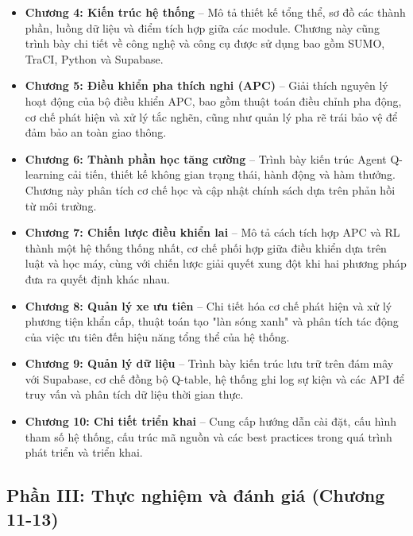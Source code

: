 \begin{itemize}[leftmargin=1.5em]
    \item \textbf{Chương 4: Kiến trúc hệ thống} -- Mô tả thiết kế tổng thể, sơ đồ các thành phần, luồng dữ liệu và điểm tích hợp giữa các module. Chương này cũng trình bày chi tiết về công nghệ và công cụ được sử dụng bao gồm SUMO, TraCI, Python và Supabase.
    
    \item \textbf{Chương 5: Điều khiển pha thích nghi (APC)} -- Giải thích nguyên lý hoạt động của bộ điều khiển APC, bao gồm thuật toán điều chỉnh pha động, cơ chế phát hiện và xử lý tắc nghẽn, cũng như quản lý pha rẽ trái bảo vệ để đảm bảo an toàn giao thông.
    
    \item \textbf{Chương 6: Thành phần học tăng cường} -- Trình bày kiến trúc Agent Q-learning cải tiến, thiết kế không gian trạng thái, hành động và hàm thưởng. Chương này phân tích cơ chế học và cập nhật chính sách dựa trên phản hồi từ môi trường.
    
    \item \textbf{Chương 7: Chiến lược điều khiển lai} -- Mô tả cách tích hợp APC và RL thành một hệ thống thống nhất, cơ chế phối hợp giữa điều khiển dựa trên luật và học máy, cùng với chiến lược giải quyết xung đột khi hai phương pháp đưa ra quyết định khác nhau.
    
    \item \textbf{Chương 8: Quản lý xe ưu tiên} -- Chi tiết hóa cơ chế phát hiện và xử lý phương tiện khẩn cấp, thuật toán tạo "làn sóng xanh" và phân tích tác động của việc ưu tiên đến hiệu năng tổng thể của hệ thống.
    
    \item \textbf{Chương 9: Quản lý dữ liệu} -- Trình bày kiến trúc lưu trữ trên đám mây với Supabase, cơ chế đồng bộ Q-table, hệ thống ghi log sự kiện và các API để truy vấn và phân tích dữ liệu thời gian thực.
    
    \item \textbf{Chương 10: Chi tiết triển khai} -- Cung cấp hướng dẫn cài đặt, cấu hình tham số hệ thống, cấu trúc mã nguồn và các best practices trong quá trình phát triển và triển khai.
\end{itemize}

\subsection*{Phần III: Thực nghiệm và đánh giá (Chương 11-13)}

